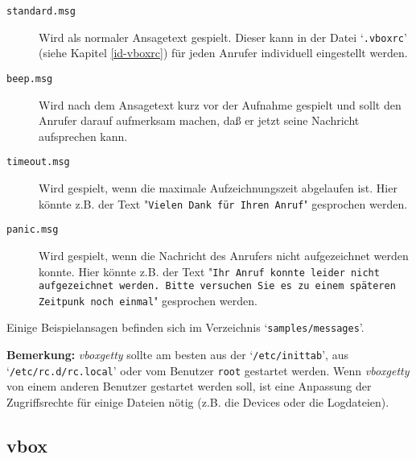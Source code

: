 \begin{description}


\item[{\tt standard.msg}] \mbox{}



Wird als normaler Ansagetext gespielt. Dieser kann in der Datei
`{\tt .vboxrc}' (siehe Kapitel \ref{id-vboxrc}) f\"{u}r
jeden Anrufer individuell eingestellt werden.



\item[{\tt beep.msg}] \mbox{}



Wird nach dem Ansagetext kurz vor der Aufnahme gespielt und sollt den
Anrufer darauf aufmerksam machen, da{\ss} er jetzt seine Nachricht
aufsprechen kann.



\item[{\tt timeout.msg}] \mbox{}



Wird gespielt, wenn die maximale Aufzeichnungszeit abgelaufen ist. Hier
k\"{o}nnte z.B. der Text "{\tt Vielen Dank f\"{u}r Ihren Anruf}" gesprochen
werden.



\item[{\tt panic.msg}] \mbox{}



Wird gespielt, wenn die Nachricht des Anrufers nicht aufgezeichnet werden
konnte. Hier k\"{o}nnte z.B. der Text "{\tt Ihr Anruf konnte leider nicht
aufgezeichnet werden. Bitte versuchen Sie es zu einem sp\"{a}teren Zeitpunk
noch einmal}" gesprochen werden.



\end{description}


Einige Beispielansagen befinden sich im Verzeichnis
`{\tt samples/messages}'.

{\bf Bemerkung:} {\em vboxgetty\/} sollte am besten aus der
`{\tt /etc/inittab}', aus `{\tt /etc/rc.d/rc.local}' oder vom Benutzer
{\tt root} gestartet werden. Wenn {\em vboxgetty\/} von einem anderen
Benutzer gestartet werden soll, ist eine Anpassung der Zugriffsrechte f\"{u}r
einige Dateien n\"{o}tig (z.B. die Devices oder die Logdateien).








\subsection{vbox\label{id-vbox}}



